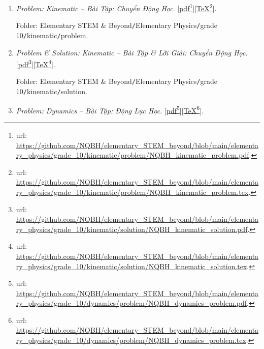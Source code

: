 \documentclass[12pt,oneside]{book}
\begin{document}
\begin{enumerate}
	\item {\it Problem: Kinematic -- Bài Tập: Chuyển Động Học}. [\href{https://github.com/NQBH/elementary_STEM_beyond/blob/main/elementary_physics/grade_10/kinematic/problem/NQBH_kinematic_problem.pdf}{pdf}\footnote{{\sc url}: \url{https://github.com/NQBH/elementary_STEM_beyond/blob/main/elementary_physics/grade_10/kinematic/problem/NQBH_kinematic_problem.pdf}.}][\href{https://github.com/NQBH/elementary_STEM_beyond/blob/main/elementary_physics/grade_10/kinematic/problem/NQBH_kinematic_problem.tex}{\TeX}\footnote{{\sc url}: \url{https://github.com/NQBH/elementary_STEM_beyond/blob/main/elementary_physics/grade_10/kinematic/problem/NQBH_kinematic_problem.tex}.}].
	
	Folder: {\sf Elementary STEM \& Beyond{\tt/}Elementary Physics{\tt/}grade 10{\tt/}kinematic{\tt/}problem}.
	
	\item {\it Problem \& Solution: Kinematic -- Bài Tập \& Lời Giải: Chuyển Động Học}. [\href{https://github.com/NQBH/elementary_STEM_beyond/blob/main/elementary_physics/grade_10/kinematic/solution/NQBH_kinematic_solution.pdf}{pdf}\footnote{{\sc url}: \url{https://github.com/NQBH/elementary_STEM_beyond/blob/main/elementary_physics/grade_10/kinematic/solution/NQBH_kinematic_solution.pdf}.}][\href{https://github.com/NQBH/elementary_STEM_beyond/blob/main/elementary_physics/grade_10/kinematic/solution/NQBH_kinematic_solution.tex}{\TeX}\footnote{{\sc url}: \url{https://github.com/NQBH/elementary_STEM_beyond/blob/main/elementary_physics/grade_10/kinematic/solution/NQBH_kinematic_solution.tex}.}].
	
	Folder: {\sf Elementary STEM \& Beyond{\tt/}Elementary Physics{\tt/}grade 10{\tt/}kinematic{\tt/}solution}.
	\item {\it Problem: Dynamics -- Bài Tập: Động Lực Học}. [\href{https://github.com/NQBH/elementary_STEM_beyond/blob/main/elementary_physics/grade_10/dynamics/problem/NQBH_dynamics_problem.pdf}{pdf}\footnote{{\sc url}: \url{https://github.com/NQBH/elementary_STEM_beyond/blob/main/elementary_physics/grade_10/dynamics/problem/NQBH_dynamics_problem.pdf}.}][\href{https://github.com/NQBH/elementary_STEM_beyond/blob/main/elementary_physics/grade_10/dynamics/problem/NQBH_dynamics_problem.tex}{\TeX}\footnote{{\sc url}: \url{https://github.com/NQBH/elementary_STEM_beyond/blob/main/elementary_physics/grade_10/dynamics/problem/NQBH_dynamics_problem.tex}.}].
	

\end{enumerate}
\end{document}
